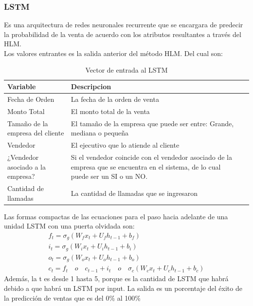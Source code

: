 \documentclass[conference]{IEEEtran}
\begin{document}
\subsubsection{LSTM}
Es una arquitectura de redes neuronales recurrente que se encargara de predecir la probabilidad de la venta de acuerdo con los atributos resultantes a través del HLM.\\
Los valores entrantes es la salida anterior del método HLM. Del cual son:\\

\begin{table}[h]
    \caption{Vector de entrada al LSTM}
    \centering
    \begin{tabularx}{0.4\textwidth} {
            | >{\raggedright\arraybackslash}X
            | >{\centering\arraybackslash}X
            | >{\raggedleft\arraybackslash}X |}
        \hline
        Variable              & Descripcion                             \\
        \hline
        Fecha de Orden        & La fecha de la orden de venta        \\
        \hline
        Monto Total           & El monto total de la venta     \\
        \hline
        Tamaño de la empresa del cliente
                              &
        El tamaño de la empresa
        que puede ser entre:
        Grande, mediana o
        pequeña                                                           \\
        \hline
        Vendedor              &
        El ejecutivo que lo atiende
        al cliente                                                        \\
        \hline
        ¿Vendedor asociado a la
        empresa?              &
        Si el vendedor coincide
        con el vendedor asociado
        de la empresa que se
        encuentra en el sistema,
        de lo cual puede ser un SI
        o un NO.                                                          \\
        \hline
        Cantidad de llamadas  & La cantidad de llamadas
        que se ingresaron                                                           \\
        \hline
    \end{tabularx}
    \label{tab2}
\end{table}
Las formas compactas de las ecuaciones para el paso hacia adelante de una unidad LSTM con una puerta olvidada son: \\
\begin{gather*}
    f_{t} =\sigma_{g}(W_{f}x_{t}+U_{f}h_{t-1}+b_{f})\\
    i_{t} = \sigma_{g}(W_{i}x_{t}+U_{i}h_{t-1}+b_{i})\\
    o_{t} = \sigma_{g}(W_{o}x_{t}+U_{o}h_{t-1}+b_{o})\\
    c_{t} = f_{t} \quad o  \quad c_{t-1}+i_{t}  \quad o  \quad \sigma_{c}(W_{c}x_{t}+U_{c}h_{t-1}+b_{c})
\end{gather*}
Además, la t es desde 1 hasta 5, porque es la cantidad de LSTM que habrá debido a que habrá un LSTM por input. La salida es un porcentaje del éxito de la predicción de ventas que es del 0\% al 100\%
\end{document}
